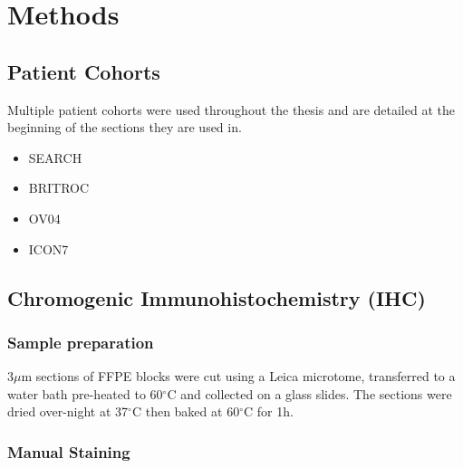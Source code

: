 
\chapter{Methods}  %

\ifpdf
    \graphicspath{{Methods/Figs/Raster/}{Methods/Figs/PDF/}{Methods/Figs/}}
\else
    \graphicspath{{Methods/Figs/Vector/}{Methods/Figs/}}
\fi


\section{Patient Cohorts} %

Multiple patient cohorts were used throughout the thesis and are detailed at the beginning of the sections they are used in. 

\begin{itemize}
    \item SEARCH
    \item BRITROC
    \item OV04
    \item ICON7
\end{itemize}

\section{Chromogenic Immunohistochemistry (IHC)}

\subsection{Sample preparation}
$3\mu$m sections of FFPE blocks were cut using a Leica microtome, transferred to a water bath pre-heated to 60${^\circ}$C and collected on a glass slides. The sections were dried over-night at 37${^\circ}$C then baked at 60${^\circ}$C for 1h. 

\subsection{Manual Staining} 

